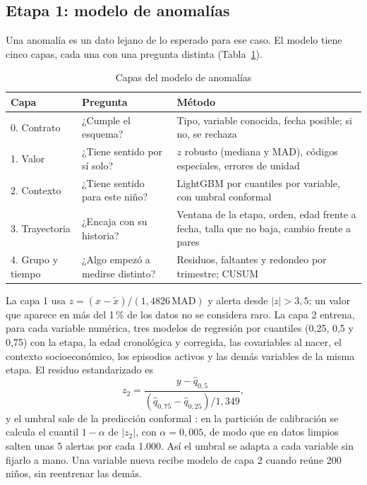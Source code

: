 \subsection{Etapa 1: modelo de anomalías}
\label{sec:met-anomalias}
Una anomalía es un dato lejano de lo esperado para ese caso. El modelo tiene cinco capas, cada una con una pregunta distinta (Tabla~\ref{tab:capas}).

\begin{table}[t]
\centering
\caption{Capas del modelo de anomalías}
\label{tab:capas}
\footnotesize
\setlength{\tabcolsep}{3pt}
\begin{tabularx}{\columnwidth}{@{}l>{\raggedright\arraybackslash}X>{\raggedright\arraybackslash}X@{}}
\toprule
\textbf{Capa} & \textbf{Pregunta} & \textbf{Método} \\
\midrule
0. Contrato & ¿Cumple el esquema? & Tipo, variable conocida, fecha posible; si no, se rechaza \\
1. Valor & ¿Tiene sentido por sí solo? & $z$ robusto (mediana y MAD), códigos especiales, errores de unidad \\
2. Contexto & ¿Tiene sentido para este niño? & LightGBM por cuantiles por variable, con umbral conformal \\
3. Trayectoria & ¿Encaja con su historia? & Ventana de la etapa, orden, edad frente a fecha, talla que no baja, cambio frente a pares \\
4. Grupo y tiempo & ¿Algo empezó a medirse distinto? & Residuos, faltantes y redondeo por trimestre; CUSUM \\
\bottomrule
\end{tabularx}
\end{table}

La capa 1 usa $z = (x - \tilde{x})/(1{,}4826\,\mathrm{MAD})$ y alerta desde $|z| > 3{,}5$; un valor que aparece en más del 1\,\% de los datos no se considera raro. La capa 2 entrena, para cada variable numérica, tres modelos de regresión por cuantiles \cite{koenker1978} (0,25, 0,5 y 0,75) con la etapa, la edad cronológica y corregida, las covariables al nacer, el contexto socioeconómico, los episodios activos y las demás variables de la misma etapa. El residuo estandarizado es
\begin{equation}
z_2 = \frac{y - \hat{q}_{0{,}5}}{(\hat{q}_{0{,}75} - \hat{q}_{0{,}25})/1{,}349},
\label{eq:z2}
\end{equation}
y el umbral sale de la predicción conformal \cite{romano2019,angelopoulos2023}: en la partición de calibración se calcula el cuantil $1-\alpha$ de $|z_2|$, con $\alpha = 0{,}005$, de modo que en datos limpios salten unas 5 alertas por cada 1.000. Así el umbral se adapta a cada variable sin fijarlo a mano. Una variable nueva recibe modelo de capa 2 cuando reúne 200 niños, sin reentrenar las demás.

